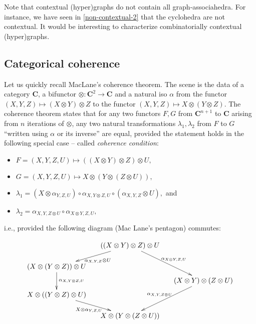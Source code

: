 
\begin{rem}
  Note that contextual (hyper)graphs do not contain all graph-associahedra.
  For instance, we have seen in \cref{non-contextual-2} that the cyclohedra are not contextual. 
  It would be interesting to characterize combinatorially contextual (hyper)graphs.
\end{rem}



\subsection{Categorical coherence}
\label{ss:coherence}

Let us quickly recall MacLane's coherence theorem.
The scene is the data of a category $\mathbf C$, a bifunctor $\otimes:\mathbf{C}^2\rightarrow \mathbf C$ and a natural iso $\alpha$ from the functor
$(X,Y,Z)\mapsto (X\otimes Y)\otimes Z$ to the functor  $(X,Y,Z)\mapsto X \otimes (Y\otimes Z)$. 
The coherence theorem states that for any two functors $F,G$ from $\mathbf{C}^{n+1}$ to $\mathbf{C}$ arising from $n$ iterations of $\otimes$, any two  natural transformations $\lambda_1,\lambda_2$ from $F$ to $G$  ``written using $\alpha$ or its inverse'' are equal, provided the statement holds in the following special case  -- called  {\em coherence condition}: 
\begin{itemize}
\item $F=(X,Y,Z,U)\mapsto ((X\otimes Y)\otimes Z)\otimes U,$ 
\item $G=(X,Y,Z,U)\mapsto X\otimes (Y\otimes (Z\otimes U)),$ 
\item $\lambda_1=(X\otimes\alpha_{Y,Z,U})\circ\alpha_{X,Y\otimes Z,U} \circ (\alpha_{X,Y,Z}\otimes U),$ and
\item $\lambda_2= \alpha_{X,Y,Z\otimes U}\circ \alpha_{X\otimes Y,Z,U},$ 
\end{itemize}
i.e., provided the following diagram (Mac Lane's pentagon) commutes:
\begin{center}
\vspace{-.5cm}
$$
 \xymatrix @-1.65pc {&& ((X\otimes Y)\otimes Z)\otimes U \ar @{->}[ddll]^{\alpha_{X,Y,Z}\otimes U} \ar @{->}[dddrr]^{\alpha_{X\otimes Y,Z,U}}&& \\
 &&&&\\
 (X\otimes (Y\otimes Z))\otimes U  \ar @{->}[dd]^{\alpha_{X,Y\otimes Z,U} }&&   && \\
 &&&&(X\otimes Y)\otimes (Z\otimes U) \ar @{->}[dddll]_{\alpha_{X,Y,Z\otimes U}}\\
 X\otimes ((Y\otimes Z)\otimes U) \ar @{->}[ddrr]_{X\otimes\alpha_{Y,Z,U}} &  &\\
 &&&&\\
 &&X\otimes (Y\otimes (Z\otimes U))&&}
$$
\end{center}

